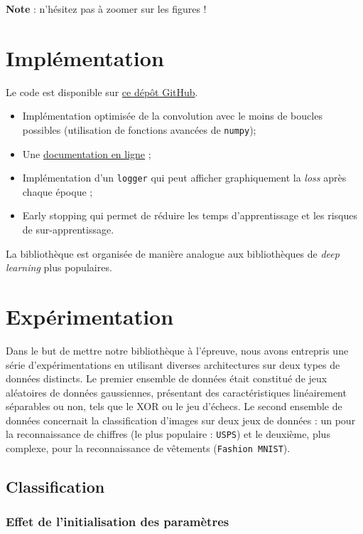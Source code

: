 \documentclass{article}
\begin{document}
\textbf{Note} : n'hésitez pas à zoomer sur les figures !

\section{Implémentation}

Le code est disponible sur \href{https://github.com/dataymeric/NeuralNetworksDIY}{ce dépôt GitHub}.

\begin{itemize}
    \item Implémentation optimisée de la convolution avec le moins de boucles possibles (utilisation de fonctions avancées de \texttt{numpy}); 
    \item Une \href{https://dataymeric.github.io/NeuralNetworksDIY/index.html}{documentation en ligne} ;
    \item Implémentation d'un \texttt{logger} qui peut afficher graphiquement la \textit{loss} après chaque époque ; 
    \item Early stopping qui permet de réduire les temps d'apprentissage et les risques de sur-apprentissage.
\end{itemize}

La bibliothèque est organisée de manière analogue aux bibliothèques de \textit{deep learning} plus populaires.

\section{Expérimentation}

Dans le but de mettre notre bibliothèque à l'épreuve, nous avons entrepris une série d'expérimentations en utilisant diverses architectures sur deux types de données distincts. Le premier ensemble de données était constitué de jeux aléatoires de données gaussiennes, présentant des caractéristiques linéairement séparables ou non, tels que le XOR ou le jeu d'échecs. Le second ensemble de données concernait la classification d'images sur deux jeux de données : un pour la reconnaissance de chiffres (le plus populaire : \texttt{USPS}) et le deuxième, plus complexe, pour la reconnaissance de vêtements (\texttt{Fashion MNIST}).

\subsection{Classification}

\subsubsection{Effet de l'initialisation des paramètres}
\end{document}
